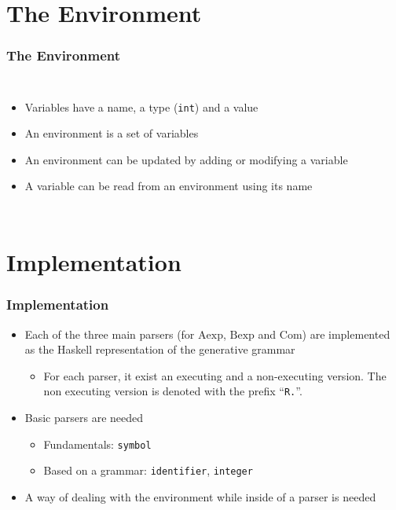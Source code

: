 \documentclass{beamer}
\begin{document}
\section{The Environment}
\begin{frame}
	\frametitle{The Environment}
	\begin{columns}
		\small
		\begin{itemize}
			\item Variables have a name, a type (\texttt{int}) and a value
			\item An environment is a set of variables
			\item An environment can be updated by adding or modifying a
				variable
			\item A variable can be read from an environment using its name
		\end{itemize}
		
		
		
		
	\end{columns}
\end{frame}

\section{Implementation}
\begin{frame}
	\frametitle{Implementation}
	\begin{itemize}
		\item Each of the three main parsers (for $\mathrm{Aexp}$, $\mathrm{Bexp}$ and $\mathrm{Com}$) are
			implemented as the Haskell representation of the generative grammar
			\begin{itemize}
				\item For each parser, it exist an executing and a
					non-executing version. The non executing version is denoted
					with the prefix ``\texttt{R.}''.
			\end{itemize}
		\item Basic parsers are needed
		\begin{itemize}
			\item Fundamentals: \texttt{symbol}
			\item Based on a grammar: \texttt{identifier}, \texttt{integer}
		\end{itemize}
		\item A way of dealing with the environment while inside of a parser is needed
	\end{itemize}
\end{frame}
\end{document}
